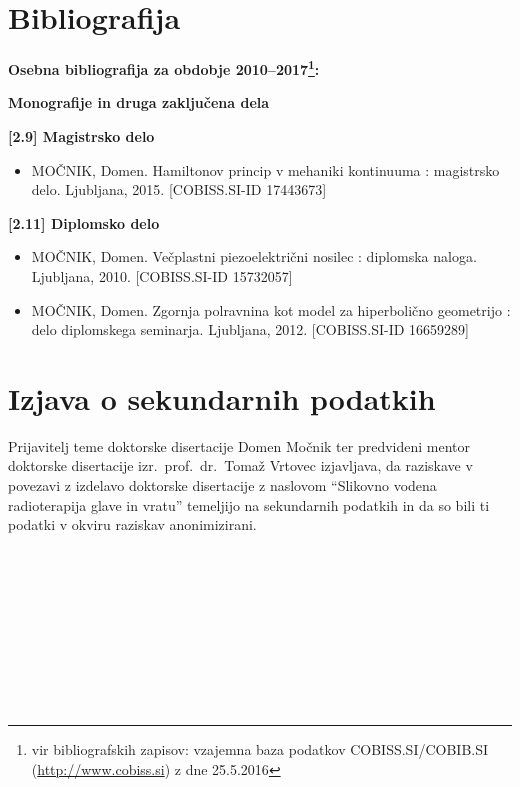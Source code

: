 \documentclass[a4paper,twoside,11pt]{article}
\begin{document}
	\section{Bibliografija}
	\par{\noindent
		\textbf{Osebna bibliografija za obdobje 2010--2017\footnote{vir bibliografskih zapisov: vzajemna baza podatkov COBISS.SI/COBIB.SI (\href{http://www.cobiss.si}{http://www.cobiss.si}) z dne 25.5.2016}: \\}
		\par{\noindent \textbf{Monografije in druga zaključena dela} \\}
		\vspace{-0.3cm}
		\par{\noindent \textbf{[2.9] Magistrsko delo}}
		\begin{itemize}[align=right, itemsep=-0.05cm]
			\item[3.] MOČNIK, Domen. Hamiltonov princip v mehaniki kontinuuma : magistrsko delo. Ljubljana, 2015. [COBISS.SI-ID 17443673]
		\end{itemize}
		\par{\noindent \textbf{[2.11] Diplomsko delo}}
		\begin{itemize}[align=right, itemsep=-0.05cm]
			\item[1.] MOČNIK, Domen. Večplastni piezoelektrični nosilec : diplomska naloga. Ljubljana, 2010. [COBISS.SI-ID 15732057]
			\item[2.] MOČNIK, Domen. Zgornja polravnina kot model za hiperbolično geometrijo : delo diplomskega seminarja. Ljubljana, 2012. [COBISS.SI-ID 16659289]
		\end{itemize}

		\newpage
		\section{Izjava o sekundarnih podatkih}
		\par{		
		Prijavitelj teme doktorske disertacije Domen Močnik ter predvideni mentor doktorske disertacije izr.\ prof.\ dr.\ Tomaž Vrtovec izjavljava, da raziskave v povezavi z izdelavo doktorske disertacije z naslovom ``Slikovno vodena radioterapija glave in vratu'' temeljijo na sekundarnih podatkih in da so bili ti podatki v okviru raziskav anonimizirani.
		}
		\\\\\\
		\noindent{}
		\\\\\\
		\noindent{} \hfill{}
		\\\\\\
		\noindent{} \hfill{}\\
		
}
\end{document}
